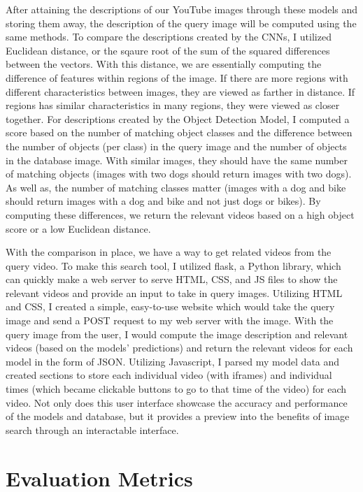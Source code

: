 \documentclass[10pt,twocolumn]{article}
\begin{document}
After attaining the descriptions of our YouTube images through these models and storing them away, the description of the query image will be computed using the same methods. To compare the descriptions created by the CNNs, I utilized Euclidean distance, or the sqaure root of the sum of the squared differences between the vectors. With this distance, we are essentially computing the difference of features within regions of the image. If there are more regions with different characteristics between images, they are viewed as farther in distance. If regions has similar characteristics in many regions, they were viewed as closer together. For descriptions created by the Object Detection Model, I computed a score based on the number of matching object classes and the difference between the number of objects (per class) in the query image and the number of objects in the database image. With similar images, they should have the same number of matching objects (images with two dogs should return images with two dogs). As well as, the number of matching classes matter (images with a dog and bike should return images with a dog and bike and not just dogs or bikes). By computing these differences, we return the relevant videos based on a high object score or a low Euclidean distance. 

With the comparison in place, we have a way to get related videos from the query video. To make this search tool, I utilized flask, a Python library, which can quickly make a web server to serve HTML, CSS, and JS files to show the relevant videos and provide an input to take in query images. Utilizing HTML and CSS, I created a simple, easy-to-use website which would take the query image and send a POST request to my web server with the image. With the query image from the user, I would compute the image description and relevant videos (based on the models' predictions) and return the relevant videos for each model in the form of JSON. Utilizing Javascript, I parsed my model data and created sections to store each individual video (with iframes) and individual times (which became clickable buttons to go to that time of the video) for each video. Not only does this user interface showcase the accuracy and performance of the models and database, but it provides a preview into the benefits of image search through an interactable interface.

\section{Evaluation Metrics}
\end{document}
